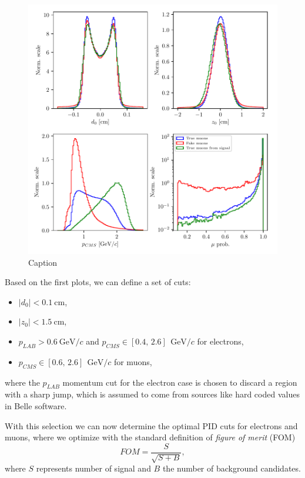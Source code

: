 \documentclass[oneside,a4paper,openany,12pt]{scrbook}
\newcommand {\e}[1]{\mathrm{~#1}}
\begin{document}
\begin{figure}[!h]
\centering
\includegraphics[scale=1]{fig/FSP_mu_vars}
\caption{Caption}
\end{figure}

Based on the first plots, we can define a set of cuts:
\begin{itemize}
\item $\vert d_0 \vert < 0.1\e{cm}$,
\item $\vert z_0 \vert < 1.5\e{cm}$,
\item $p_{LAB} > 0.6\e{GeV}/c$ and $p_{CMS} \in [0.4,\,2.6]~\e{GeV}/c$ for electrons,
\item $p_{CMS} \in [0.6,\,2.6]~\e{GeV}/c$ for muons,
\end{itemize}

where the $p_{LAB}$ momentum cut for the electron case is chosen to discard a region with a sharp jump, which is assumed to come from sources like hard coded values in Belle software.

With this selection we can now determine the optimal PID cuts for electrons and muons, where we optimize with the standard definition of \textit{figure of merit} (FOM)
\begin{equation}
\label{eq:fom}
FOM = \frac{S}{\sqrt{S+B}},
\end{equation} 
where $S$ represents number of signal and $B$ the number of background candidates.
\end{document}
